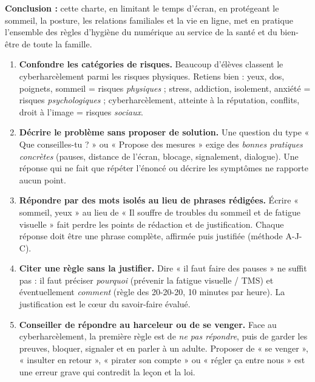\documentclass[11pt]{article}
\begin{document}
\begin{exoresolu}
\textbf{Conclusion :} cette charte, en limitant le temps d'écran, en protégeant le sommeil, la posture, les relations familiales et la vie en ligne, met en pratique l'ensemble des règles d'hygiène du numérique au service de la santé et du bien-être de toute la famille.
\end{exoresolu}

\begin{attention}
\begin{enumerate}
\item \textbf{Confondre les catégories de risques.} Beaucoup d'élèves classent le cyberharcèlement parmi les risques physiques. Retiens bien : yeux, dos, poignets, sommeil = risques \emph{physiques} ; stress, addiction, isolement, anxiété = risques \emph{psychologiques} ; cyberharcèlement, atteinte à la réputation, conflits, droit à l'image = risques \emph{sociaux}.
\item \textbf{Décrire le problème sans proposer de solution.} Une question du type « Que conseilles-tu ? » ou « Propose des mesures » exige des \emph{bonnes pratiques concrètes} (pauses, distance de l'écran, blocage, signalement, dialogue). Une réponse qui ne fait que répéter l'énoncé ou décrire les symptômes ne rapporte aucun point.
\item \textbf{Répondre par des mots isolés au lieu de phrases rédigées.} Écrire « sommeil, yeux » au lieu de « Il souffre de troubles du sommeil et de fatigue visuelle » fait perdre les points de rédaction et de justification. Chaque réponse doit être une phrase complète, affirmée puis justifiée (méthode A-J-C).
\item \textbf{Citer une règle sans la justifier.} Dire « il faut faire des pauses » ne suffit pas : il faut préciser \emph{pourquoi} (prévenir la fatigue visuelle / TMS) et éventuellement \emph{comment} (règle des 20-20-20, 10 minutes par heure). La justification est le cœur du savoir-faire évalué.
\item \textbf{Conseiller de répondre au harceleur ou de se venger.} Face au cyberharcèlement, la première règle est de \emph{ne pas répondre}, puis de garder les preuves, bloquer, signaler et en parler à un adulte. Proposer de « se venger », « insulter en retour », « pirater son compte » ou « régler ça entre nous » est une erreur grave qui contredit la leçon et la loi.
\end{enumerate}
\end{attention}

\newpage
\end{document}

